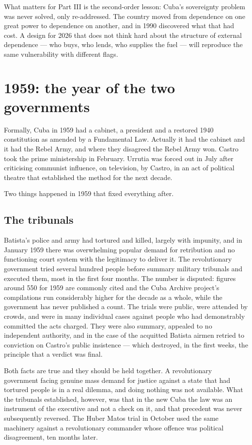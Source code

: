 What matters for Part III is the second-order lesson: Cuba's sovereignty
problem was never solved, only re-addressed. The country moved from dependence
on one great power to dependence on another, and in 1990 discovered what that
had cost. A design for 2026 that does not think hard about the structure of
external dependence --- who buys, who lends, who supplies the fuel --- will
reproduce the same vulnerability with different flags.

\section{1959: the year of the two governments}

Formally, Cuba in 1959 had a cabinet, a president and a restored 1940
constitution as amended by a Fundamental Law. Actually it had the cabinet and
it had the Rebel Army, and where they disagreed the Rebel Army won. Castro took
the prime ministership in February. Urrutia was forced out in July after
criticising communist influence, on television, by Castro, in an act of
political theatre that established the method for the next decade.

Two things happened in 1959 that fixed everything after.

\subsection{The tribunals}

Batista's police and army had tortured and killed, largely with impunity, and
in January 1959 there was overwhelming popular demand for retribution and no
functioning court system with the legitimacy to deliver it. The revolutionary
government tried several hundred people before summary military tribunals and
executed them, most in the first four months. The number is disputed: figures
around 550 for 1959 are commonly cited and the Cuba Archive project's
compilations run considerably higher for the decade as a whole, while the
government has never published a count.\unv{} The trials were public, were
attended by crowds, and were in many individual cases against people who had
demonstrably committed the acts charged. They were also summary, appealed to no
independent authority, and in the case of the acquitted Batista airmen retried
to conviction on Castro's public insistence --- which destroyed, in the first
weeks, the principle that a verdict was final.

Both facts are true and they should be held together. A revolutionary
government facing genuine mass demand for justice against a state that had
tortured people is in a real dilemma, and doing nothing was not available. What
the tribunals established, however, was that in the new Cuba the law was an
instrument of the executive and not a check on it, and that precedent was never
subsequently reversed. The Huber Matos trial in October used the same machinery
against a revolutionary commander whose offence was political disagreement, ten
months later.


